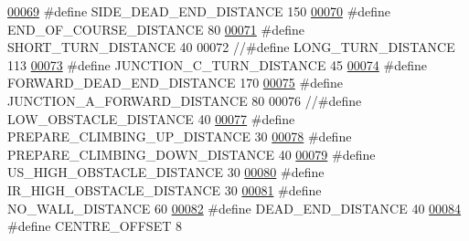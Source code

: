 \begin{DoxyCode}
\hypertarget{state__machine_8h_source.tex_l00069}{}\hyperlink{state__machine_8h_a31ba7e3e0116f665d5825f669052ed09}{00069} \textcolor{preprocessor}{#define SIDE\_DEAD\_END\_DISTANCE 150      }
\hypertarget{state__machine_8h_source.tex_l00070}{}\hyperlink{state__machine_8h_a9a1286b84f437e1c90d21ffc833a8b79}{00070} \textcolor{preprocessor}{#define END\_OF\_COURSE\_DISTANCE 80       }
\hypertarget{state__machine_8h_source.tex_l00071}{}\hyperlink{state__machine_8h_adf843098ef425aa129f5ff16d879f7f2}{00071} \textcolor{preprocessor}{#define SHORT\_TURN\_DISTANCE 40          }
00072 \textcolor{preprocessor}{//#define LONG\_TURN\_DISTANCE 113            }
\hypertarget{state__machine_8h_source.tex_l00073}{}\hyperlink{state__machine_8h_a8f7e1b7ccc92504f03ca42fb3e76e7d4}{00073} \textcolor{preprocessor}{#define JUNCTION\_C\_TURN\_DISTANCE 45}
\hypertarget{state__machine_8h_source.tex_l00074}{}\hyperlink{state__machine_8h_a8118fdbf1a36265000f2d42844e10747}{00074} \textcolor{preprocessor}{#define FORWARD\_DEAD\_END\_DISTANCE 170   }
\hypertarget{state__machine_8h_source.tex_l00075}{}\hyperlink{state__machine_8h_ada224a95ca04ac21b410ef6e23814eea}{00075} \textcolor{preprocessor}{#define JUNCTION\_A\_FORWARD\_DISTANCE 80  }
00076 \textcolor{preprocessor}{//#define LOW\_OBSTACLE\_DISTANCE 40      }
\hypertarget{state__machine_8h_source.tex_l00077}{}\hyperlink{state__machine_8h_a1bdeb86204e23b0e597ffe87d6579167}{00077} \textcolor{preprocessor}{#define PREPARE\_CLIMBING\_UP\_DISTANCE 30 }
\hypertarget{state__machine_8h_source.tex_l00078}{}\hyperlink{state__machine_8h_af7fbc26bb7b50f3502c893ecdccd8ab4}{00078} \textcolor{preprocessor}{#define PREPARE\_CLIMBING\_DOWN\_DISTANCE 40   }
\hypertarget{state__machine_8h_source.tex_l00079}{}\hyperlink{state__machine_8h_a647ce7a809da5ed12ea5319ed1c2b73f}{00079} \textcolor{preprocessor}{#define US\_HIGH\_OBSTACLE\_DISTANCE 30    }
\hypertarget{state__machine_8h_source.tex_l00080}{}\hyperlink{state__machine_8h_a83b61a7a575cb23097805af83236bcf0}{00080} \textcolor{preprocessor}{#define IR\_HIGH\_OBSTACLE\_DISTANCE 30    }
\hypertarget{state__machine_8h_source.tex_l00081}{}\hyperlink{state__machine_8h_a9d981c215ebe94b6be6a0d49ccd2dce8}{00081} \textcolor{preprocessor}{#define NO\_WALL\_DISTANCE 60             }
\hypertarget{state__machine_8h_source.tex_l00082}{}\hyperlink{state__machine_8h_aa31835133338361e7bffbaf776c9c7a1}{00082} \textcolor{preprocessor}{#define DEAD\_END\_DISTANCE 40            }
\hypertarget{state__machine_8h_source.tex_l00084}{}\hyperlink{state__machine_8h_a5490b49530b86e69dba553166cd9d71b}{00084} \textcolor{preprocessor}{#define CENTRE\_OFFSET 8 }

\end{DoxyCode}
